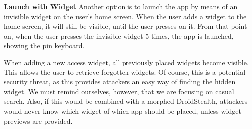 \textbf{Launch with Widget}
Another option is to launch the app by means of an invisible widget on the user's home screen. 
When the user adds a widget to the home screen, it will still be visible, until the user presses on it. 
From that point on, when the user presses the invisible widget 5 times, the app is launched, showing the pin keyboard.

When adding a new access widget, all previously placed widgets become visible. This allows 
the user to retrieve forgotten widgets. Of course, this is a potential security threat, as this 
provides attackers an easy way of finding the hidden widget. We must remind ourselves, 
however, that we are focusing on casual search. Also, if this would be combined with
a morphed DroidStealth, attackers would never know which widget of which app should be
placed, unless widget previews are provided.

